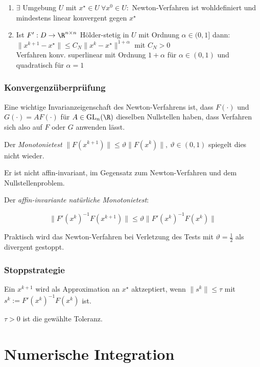 \begin{enumerate}[label=(\alph*)]
	\item $\exists$ Umgebung $U$ mit $x^\star \in U \ \forall x^0 \in U : $ Newton-Verfahren ist wohldefiniert und mindestens linear konvergent gegen $x^\star$
	\item Ist $F' : D \to \R^{n \times n}$ Hölder-stetig in $U$ mit Ordnung $\alpha \in (0,1]$ dann: \\ $\|x^{k+1}-x^\star\| \leq C_N \|x^k-x^\star\|^{1+\alpha}$ mit $C_N > 0$ \\ Verfahren konv. superlinear mit Ordnung $1+\alpha$ für $\alpha \in (0,1)$ und quadratisch für $\alpha = 1$
\end{enumerate}

\subsubsection*{Konvergenzüberprüfung}

Eine wichtige Invarianzeigenschaft des Newton-Verfahrens ist, dass $F(\cdot)$ und $G(\cdot) = AF(\cdot)$ für $A \in \text{GL}_n(\R)$ dieselben Nullstellen haben, dass Verfahren sich also auf $F$ oder $G$ anwenden lässt.

Der \emph{Monotonietest} $\|F(x^{k+1})\| \leq \vartheta\|F(x^k)\|, \ \vartheta \in (0,1)$ spiegelt dies nicht wieder.

Er ist nicht affin-invariant, im Gegensatz zum Newton-Verfahren und dem Nullstellenproblem.

\vspace*{1mm}

Der \emph{affin-invariante natürliche Monotonietest}:

\vspace{-2mm}
$$\|F'(x^k)^{-1}F(x^{k+1})\| \leq \vartheta\|F'(x^k)^{-1}F(x^k)\|$$

Praktisch wird das Newton-Verfahren bei Verletzung des Tests mit $\vartheta = \frac{1}{2}$ als divergent gestoppt.

\subsubsection*{Stoppstrategie}

Ein $x^{k+1}$ wird als Approximation an $x^\star$ aktzeptiert, wenn $\|s^k\| \leq \tau$ mit $s^k := F'(x^k)^{-1}F(x^k)$ ist.

$\tau > 0$ ist die gewählte Toleranz.

\section*{Numerische Integration}
